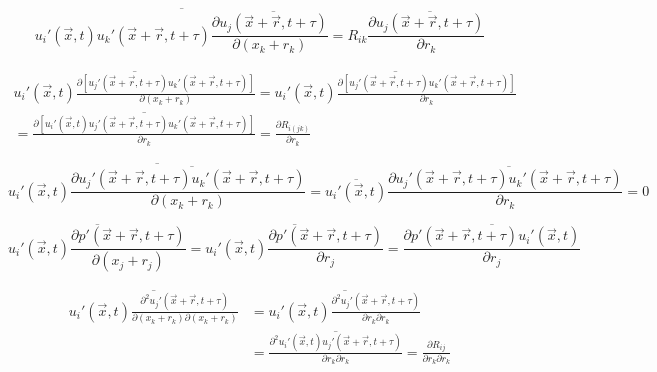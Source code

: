 \documentclass[paper=a4, fontsize=11pt]{scrartcl} %
\numberwithin{equation}{section} %
\numberwithin{figure}{section} %
\numberwithin{table}{section} %
\begin{document}
	 \begin{equation}
	 	\overline{u_i'(\vec{x}, t)u_k'(\vec{x} + \vec{r}, t + \tau)\frac{\partial \overline{u_j(\vec{x} + \vec{r}, t + \tau)}}{\partial (x_k+r_k)}} = R_{ik} \frac{\partial \overline{u_j(\vec{x} + \vec{r}, t + \tau)}}{\partial r_k}
	 \end{equation}
	 
	 \begin{equation}
	 	\begin{aligned}
	 		\overline{u_i'(\vec{x}, t) \frac{\partial [u_j'(\vec{x} + \vec{r}, t + \tau)u_k'(\vec{x} + \vec{r}, t + \tau)]}{\partial  (x_k+r_k)}} = \overline{u_i'(\vec{x}, t) \frac{\partial [u_j'(\vec{x} + \vec{r}, t + \tau)u_k'(\vec{x} + \vec{r}, t + \tau)]}{\partial r_k}}\\
	 		= \overline{\frac{\partial [u_i'(\vec{x}, t) u_j'(\vec{x} + \vec{r}, t + \tau)u_k'(\vec{x} + \vec{r}, t + \tau)]}{\partial r_k}} = \frac{\partial R_{i(jk)}}{\partial r_k}
	 	\end{aligned}
	 \end{equation}
	 
	 \begin{equation}
	 	\overline{u_i'(\vec{x}, t) \frac{\partial \overline{u_j'(\vec{x} + \vec{r}, t + \tau)u_k'(\vec{x} + \vec{r}, t + \tau)}}{\partial (x_k+r_k)}} = \overline{u_i'(\vec{x}, t)} \frac{\partial \overline{u_j'(\vec{x} + \vec{r}, t + \tau)u_k'(\vec{x} + \vec{r}, t + \tau)}}{\partial r_k} = 0
	 \end{equation}
	 
	 \begin{equation}
	 	\overline{u_i'(\vec{x}, t) \frac{\partial p'(\vec{x} + \vec{r}, t + \tau)}{\partial (x_j + r_j)}} = \overline{u_i'(\vec{x}, t) \frac{\partial p'(\vec{x} + \vec{r}, t + \tau)}{\partial r_j}} = \overline{\frac{\partial p'(\vec{x} + \vec{r}, t + \tau)u_i'(\vec{x}, t)}{\partial r_j}}
	 \end{equation}
	 
	 \begin{equation}
	 	\begin{aligned}
	 		\overline{u_i'(\vec{x}, t) \frac{\partial^2 u_j'(\vec{x} + \vec{r}, t + \tau)}{\partial (x_k+r_k) \partial (x_k+r_k)}} &= \overline{u_i'(\vec{x}, t) \frac{\partial^2 u_j'(\vec{x} + \vec{r}, t + \tau)}{\partial r_k \partial r_k}} \\
	 		& = \overline{ \frac{\partial^2 u_i'(\vec{x}, t) u_j'(\vec{x} + \vec{r}, t + \tau)}{\partial r_k \partial r_k}} = \frac{\partial R_{ij}}{\partial r_k \partial r_k}
	 	\end{aligned}
	 \end{equation}
	 
\end{document}
